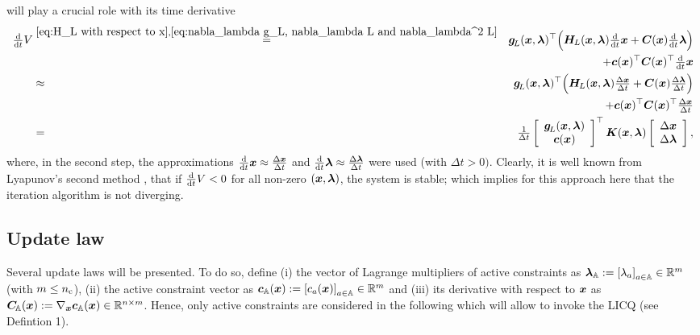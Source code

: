 \documentclass[journal]{IEEEtranTIE}
\begin{document}
will play a crucial role with its time derivative
%
\begin{eqnarray}
\ddtsmall V & \stackrel{\eqref{eq:H_L with respect to x},\eqref{eq:nabla_lambda g_L, nabla_lambda L and nabla_lambda^2 L}}{=} & \mv{g}_{\!L}(\mv{x},\mv{\lambda})^\top \Big( \mm{H}_{\! L}(\mv{x},\mv{\lambda})\ddtsmall \mv{x} + \mm{C}(\mv{x})\ddtsmall \mv{\lambda} \Big) \notag  \\ 
& & +  \mv{c}(\mv{x})^\top \mm{C}(\mv{x})^\top\ddtsmall \mv{x} \label{eq:d/dt V} \\
& \approx & \mv{g}_{\!L}(\mv{x},\mv{\lambda})^\top \Big( \mm{H}_{\! L}(\mv{x},\mv{\lambda})\tfrac{\Delta \mv{x}}{\Delta t}  + \mm{C}(\mv{x}) \tfrac{\Delta \mv{\lambda}}{\Delta t}  \Big) \notag   \\ 
& & + \mv{c}(\mv{x})^\top \mm{C}(\mv{x})^\top \tfrac{\Delta \mv{x}}{\Delta t}\\
& = & \tfrac{1}{\Delta t}\left[ {\begin{array}{*{20}{c}}
{\mv{g}_{\!L}}(\mv{x},\mv{\lambda})\\
{\mv{c}}(\mv{x})
\end{array}} \right]^\top \mm{K}(\mv{x},\mv{\lambda}) \left[ {\begin{array}{*{20}{c}}
{\Delta \mv{x}}\\
{\Delta \mv{\lambda}}
\end{array}} \right],\label{eq:Delta V / Delta t}
\end{eqnarray}
%
where, in the second step, the approximations $\tfrac{\mathrm{d}}{\mathrm{d}t} \boldsymbol{x} \approx \tfrac{\Delta \boldsymbol{x}}{\Delta t} $ and $\tfrac{\mathrm{d}}{\mathrm{d}t} \boldsymbol{\lambda} \approx  \tfrac{\Delta \boldsymbol{\lambda}}{\Delta t}$ were used (with $\Delta t >0)$. 
Clearly, it is well known from Lyapunov's second method \cite{khalil2002nonlinear}, that if $\tfrac{\mathrm{d}}{\mathrm{d}t} V < 0$ for all non-zero $(\boldsymbol{x},\boldsymbol{\lambda})$, the system is stable; which implies for this approach here that the iteration algorithm is not diverging.


\subsection{Update law}\label{subsec:iter_law}
Several update laws will be presented. To do so, define (i) the vector of Lagrange multipliers of active constraints as $\boldsymbol{\lambda}_{\mathbb{A}} := \left[ \lambda_a \right]_{a \in \mathbb{A}} \in \mathbb{R}^m$ (with $m \leq n_{\rm c}$), (ii) the active constraint vector as $\boldsymbol{c}_{\mathbb{A}}(\boldsymbol{x}) := \left[ c_a(\boldsymbol{x}) \right]_{a \in \mathbb{A}} \in \mathbb{R}^m$ and (iii) its derivative with respect to $\boldsymbol{x}$ as $\boldsymbol{C}_{\!\mathbb{A}}(\boldsymbol{x}) := \nabla_{\boldsymbol{x}} \boldsymbol{c}_{\mathbb{A}}(\boldsymbol{x}) \in \mathbb{R}^{n \times m}$. Hence, only active constraints are considered in the following which will allow to invoke the LICQ (see Defintion 1).
\end{document}
